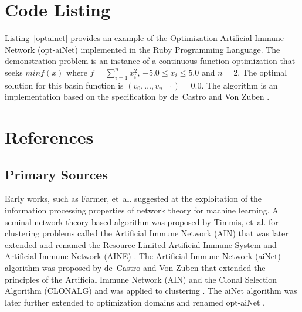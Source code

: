\documentclass[a4paper, 11pt]{article}
\begin{document}
\section{Code Listing}
\label{sec:code}
Listing~\ref{optainet} provides an example of the Optimization Artificial Immune Network (opt-aiNet) implemented in the Ruby Programming Language.
The demonstration problem is an instance of a continuous function optimization that seeks $min f(x)$ where $f=\sum_{i=1}^n x_{i}^2$, $-5.0\leq x_i \leq 5.0$ and $n=2$. The optimal solution for this basin function is $(v_0,\ldots,v_{n-1})=0.0$.
The algorithm is an implementation based on the specification by de~Castro and Von Zuben \cite{Castro2002c}.




\section{References}
\label{sec:references}

% 
% 
\subsection{Primary Sources}
Early works, such as Farmer, et~al. \cite{Farmer1986} suggested at the exploitation of the information processing properties of network theory for machine learning.
A seminal network theory based algorithm was proposed by Timmis, et~al. for clustering problems called the Artificial Immune Network (AIN) \cite{Timmis2000} that was later extended and renamed the Resource Limited Artificial Immune System \cite{Timmis2001} and Artificial Immune Network (AINE) \cite{Knight2001}.
The Artificial Immune Network (aiNet) algorithm was proposed by de~Castro and Von Zuben that extended the principles of the Artificial Immune Network (AIN) and the Clonal Selection Algorithm (CLONALG) and was applied to clustering \cite{Castro2000a}. The aiNet algorithm was later further extended to optimization domains and renamed opt-aiNet \cite{Castro2002c}.
\end{document}
